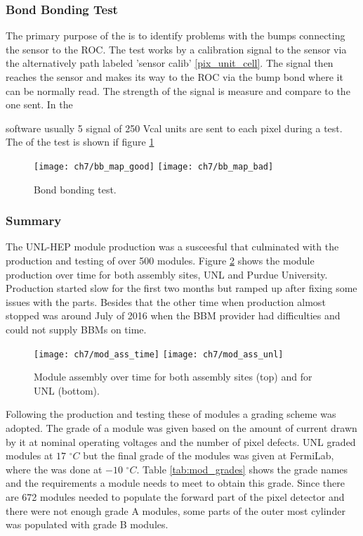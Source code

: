 \subsubsection{Bond Bonding Test}
{} The primary purpose of the  is to identify problems with the bumps connecting the sensor to the ROC. The test works by a calibration signal to the sensor via the alternatively path labeled 'sensor calib' \ref{pix_unit_cell}. The signal then reaches the sensor and makes its way to the ROC via the bump bond where it can be normally read. The strength of the signal is measure and compare to the one sent. In the { software usually 5 signal of 250 Vcal units are sent to each pixel during a  test. The {} of the test is shown if figure \ref{fig:bb_map}    

\begin{figure}[!h]
	\centering
	\texttt{[image: ch7/bb\_map\_good]}
	\texttt{[image: ch7/bb\_map\_bad]}
	\caption[Bond bonding test.]{Bond bonding test.}
	\label{fig:bb_map}
\end{figure}

\subsubsection{Summary}
The UNL-HEP module production was a susceesful {} that culminated with the production and testing of over 500 modules. Figure \ref{mod_ass_time} shows the module production over time for both assembly sites, UNL and Purdue University. Production started slow for the first two months but ramped up after fixing some issues with the parts. Besides that the other time when production almost stopped was around July of 2016 when the BBM provider had difficulties and could not supply BBMs on time. {}

\begin{figure}[ht]
	\centering
	\texttt{[image: ch7/mod\_ass\_time]}
	\texttt{[image: ch7/mod\_ass\_unl]}
	\caption[Module assembly over time.]{Module assembly over time for both assembly sites (top) and for UNL (bottom).}
	\label{mod_ass_time}
\end{figure}

Following the production and testing these of modules a grading scheme was adopted. The grade of a module was given based on the amount of current drawn by it at nominal operating voltages and the number of pixel defects. UNL graded modules at $17$ $^{\circ} C$ but the final grade of the modules was given at FermiLab, where the  was done at $-10$ $^{\circ} C$. Table \ref{tab:mod_grades} shows the grade names and the requirements a module needs to meet to obtain this grade. Since there are 672 modules needed to populate the forward part of the pixel detector and there were not enough grade A modules, some parts of the outer most cylinder was populated with grade B modules.  


}
